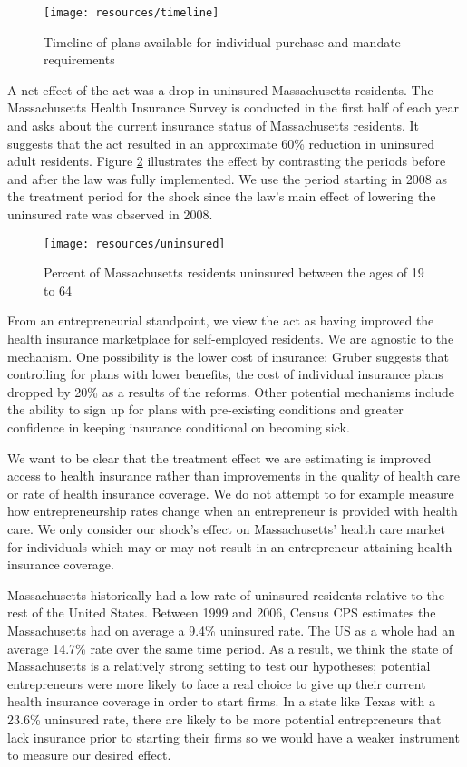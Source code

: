 \documentclass[12pt]{article}
\begin{document}
\begin{figure}[H]
	\centering
	\texttt{[image: resources/timeline]}
	\caption{Timeline of plans available for individual purchase and mandate requirements}
	\label{fig:reformTimeline}
\end{figure}

A net effect of the act was a drop in uninsured Massachusetts residents. The Massachusetts Health Insurance Survey is conducted in the first half of each year and asks about the current insurance status of Massachusetts residents. It suggests that the act resulted in an approximate 60\% reduction in uninsured adult residents. Figure \ref{fig:uninsuredRate} illustrates the effect by contrasting the periods before and after the law was fully implemented. We use the period starting in 2008 as the treatment period for the shock since the law's main effect of lowering the uninsured rate was observed in 2008. 

\begin{figure}[H]
	\centering
	\texttt{[image: resources/uninsured]}
	\caption{Percent of Massachusetts residents uninsured between the ages of 19 to 64}
	\label{fig:uninsuredRate}
\end{figure}

From an entrepreneurial standpoint, we view the act as having improved the health insurance marketplace for self-employed residents. We are agnostic to the mechanism. One possibility is the lower cost of insurance; Gruber \citep{gruber2011massachusetts} suggests that controlling for plans with lower benefits, the cost of individual insurance plans dropped by 20\% as a results of the reforms. Other potential mechanisms include the ability to sign up for plans with pre-existing conditions and greater confidence in keeping insurance conditional on becoming sick. 

We want to be clear that the treatment effect we are estimating is improved access to health insurance rather than improvements in the quality of health care or rate of health insurance coverage. We do not attempt to for example measure how entrepreneurship rates change when an entrepreneur is provided with health care. We only consider our shock's effect on Massachusetts' health care market for individuals which may or may not result in an entrepreneur attaining health insurance coverage. 

Massachusetts historically had a low rate of uninsured residents relative to the rest of the United States. Between 1999 and 2006, Census CPS estimates the Massachusetts had on average a 9.4\% uninsured rate. The US as a whole had an average 14.7\% rate over the same time period. As a result, we think the state of Massachusetts is a relatively strong setting to test our hypotheses; potential entrepreneurs were more likely to face a real choice to give up their current health insurance coverage in order to start firms. In a state like Texas with a 23.6\% uninsured rate, there are likely to be more potential entrepreneurs that lack insurance prior to starting their firms so we would have a weaker instrument to measure our desired effect. 
\end{document}
